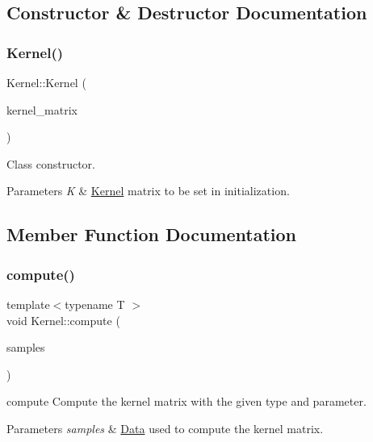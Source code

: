 \subsection{Constructor \& Destructor Documentation}
\mbox{\label{class_kernel_adf23c1567adb8ddb5757931587320871}} 
\subsubsection{\texorpdfstring{Kernel()}{Kernel()}}
{\footnotesize\ttfamily Kernel\+::\+Kernel (\begin{DoxyParamCaption}\item[{d\+Matrix}]{kernel\+\_\+matrix }\end{DoxyParamCaption})}



Class constructor. 


\begin{DoxyParams}{Parameters}
{\em K} & \mbox{\hyperlink{class_kernel}{Kernel}} matrix to be set in initialization. \\
\hline
\end{DoxyParams}


\subsection{Member Function Documentation}
\mbox{\label{class_kernel_a214aeb35c89e67cf7677c61f7b0a843f}} 
\subsubsection{\texorpdfstring{compute()}{compute()}}
{\footnotesize\ttfamily template$<$typename T $>$ \\
void Kernel\+::compute (\begin{DoxyParamCaption}\item[{std\+::shared\+\_\+ptr$<$ \mbox{\hyperlink{class_data}{Data}}$<$ T $>$ $>$}]{samples }\end{DoxyParamCaption})}



compute Compute the kernel matrix with the given type and parameter. 


\begin{DoxyParams}{Parameters}
{\em samples} & \mbox{\hyperlink{class_data}{Data}} used to compute the kernel matrix. \\
\hline
\end{DoxyParams}
\mbox{\label{class_kernel_a48ef2d6a0786b1a150f75af3f595c536}} 
